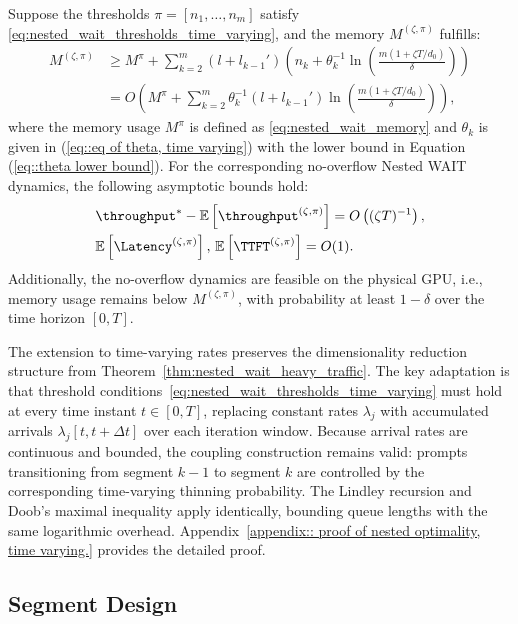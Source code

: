 \begin{theorem}
\label{thm:nested_wait_heavy_traffic_time_varying}
Suppose the thresholds $\pi = [n_1, \dots, n_m]$ satisfy \eqref{eq:nested_wait_thresholds_time_varying}, and the memory $M^{(\zeta,\pi)}$ fulfills:
\[
\begin{aligned}
M^{(\zeta,\pi)}
&\geq M^{\pi} + \sum_{k=2}^m (l + l_{k-1}') \left(n_k + \theta_k^{-1} \ln\!\left( \tfrac{m(1+\zeta T/d_0)}{\delta} \right)\right) \\
    &= O\!\left( M^\pi + \sum_{k=2}^m \theta_k^{-1}  (l + l_{k-1}') \ln\!\left( \tfrac{m(1+\zeta T/d_0)}{\delta} \right) \right),
\end{aligned}
\]
where the memory usage $M^\pi$ is defined as \eqref{eq:nested_wait_memory} and $\theta_k$ is given in (\ref{eq::eq of theta, time varying}) with the lower bound in Equation (\ref{eq::theta lower bound}).
For the corresponding no-overflow Nested WAIT dynamics, the following asymptotic bounds hold:
$$
    \begin{aligned}
        &\throughput^* - \mathbb{E}\left[ \throughput^{(\zeta, \pi)} \right] 
   = O\left( (\zeta T)^{-1} \right), \\
&\mathbb{E}\left[ \Latency^{(\zeta, \pi)} \right], \,\mathbb{E}\left[ \TTFT^{(\zeta, \pi)} \right] = O(1).
    \end{aligned}
$$
Additionally, the no-overflow dynamics are feasible on the physical GPU, i.e., memory usage remains below $M^{(\zeta,\pi)}$, with probability at least $1 - \delta$ over the time horizon $[0,T].$
\end{theorem}

The extension to time-varying rates preserves the dimensionality reduction structure from Theorem~\ref{thm:nested_wait_heavy_traffic}. The key adaptation is that threshold conditions~\eqref{eq:nested_wait_thresholds_time_varying} must hold at every time instant $t \in [0,T]$, replacing constant rates $\lambda_j$ with accumulated arrivals $\lambda_j[t, t+\Delta t]$ over each iteration window. Because arrival rates are continuous and bounded, the coupling construction remains valid: prompts transitioning from segment \(k-1\) to segment \(k\) are controlled by the corresponding time-varying thinning probability. The Lindley recursion and Doob's maximal inequality apply identically, bounding queue lengths with the same logarithmic overhead. Appendix~\ref{appendix:: proof of nested optimality, time varying.} provides the detailed proof.

\subsection{Segment Design}\label{sec:segment_design}

